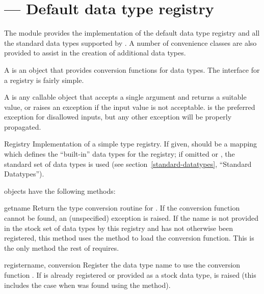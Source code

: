 \documentclass{howto}
\begin{document}
\section{ --- Default data type registry}


The  module provides the implementation of
the default data type registry and all the standard data types
supported by .  A number of convenience classes are
also provided to assist in the creation of additional data types.

A  is an object that provides conversion
functions for data types.  The interface for a registry is fairly
simple.

A  is any callable object that accepts a
single argument and returns a suitable value, or raises an exception
if the input value is not acceptable.   is the
preferred exception for disallowed inputs, but any other exception
will be properly propagated.

\begin{classdesc}{Registry}{}
  Implementation of a simple type registry.  If given, 
  should be a mapping which defines the ``built-in'' data types for
  the registry; if omitted or , the standard set of data
  types is used (see section~\ref{standard-datatypes}, ``Standard
   Datatypes'').
\end{classdesc}

 objects have the following methods:

\begin{methoddesc}{get}{name}
  Return the type conversion routine for .  If the
  conversion function cannot be found, an (unspecified) exception is
  raised.  If the name is not provided in the stock set of data types
  by this registry and has not otherwise been registered, this method
  uses the  method to load the conversion function.
  This is the only method the rest of  requires.
\end{methoddesc}

\begin{methoddesc}{register}{name, conversion}
  Register the data type name  to use the conversion
  function .  If  is already registered or
  provided as a stock data type,  is raised
  (this includes the case when  was found using the
   method).
\end{methoddesc}
\end{document}
